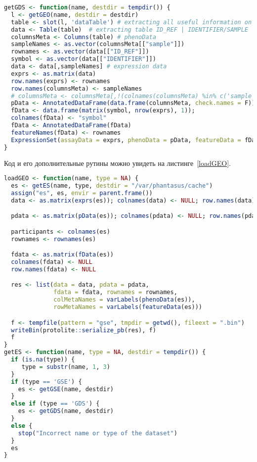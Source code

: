 \documentclass[specification,annotation]{itmo-student-thesis}
\begin{document}
\begin{lstlisting}[float=!h,caption={Загрузка данных типа GDS из Gene Expression Omnibus},label={getGDS},language=R]
 getGDS <- function(name, destdir = tempdir()) {
  l <- getGEO(name, destdir = destdir)
  table <- slot(l, 'dataTable') # extracting all useful information on dataset
  data <- Table(table)  # extracting table ID_REF | IDENTIFIER/SAMPLE | SAMPLE1 | ...
  columnsMeta <- Columns(table) # phenoData
  sampleNames <- as.vector(columnsMeta[["sample"]])
  rownames <- as.vector(data[["ID_REF"]])
  symbol <- as.vector(data[["IDENTIFIER"]])
  data <- data[,sampleNames] # expression data
  exprs <- as.matrix(data)
  row.names(exprs) <- rownames
  row.names(columnsMeta) <- sampleNames
  # columnsMeta <- columnsMeta[,!(colnames(columnsMeta) %in% c('sample'))] 
  pData <- AnnotatedDataFrame(data.frame(columnsMeta, check.names = F))
  fData <- data.frame(matrix(symbol, nrow(exprs), 1));
  colnames(fData) <- "symbol"
  fData <- AnnotatedDataFrame(fData)
  featureNames(fData) <- rownames
  ExpressionSet(assayData = exprs, phenoData = pData, featureData = fData)
}
\end{lstlisting}

Код и его дополнительные рутины можно увидеть на листинге~\ref{loadGEO}.

\begin{lstlisting}[float=!h,caption={Загрузка данных из Gene Expression Omnibus},label={loadGEO},language=R]
loadGEO <- function(name, type = NA) {
  es <- getES(name, type, destdir = "/var/phantasus/cache")
  assign("es", es, envir = parent.frame())
  data <- as.matrix(exprs(es)); colnames(data) <- NULL; row.names(data) <- NULL

  pdata <- as.matrix(pData(es)); colnames(pdata) <- NULL; row.names(pdata) <- NULL

  participants <- colnames(es)
  rownames <- rownames(es)

  fdata <- as.matrix(fData(es))
  colnames(fdata) <- NULL
  row.names(fdata) <- NULL

  res <- list(data = data, pdata = pdata,
              fdata = fdata, rownames = rownames,
              colMetaNames = varLabels(phenoData(es)),
              rowMetaNames = varLabels(featureData(es)))

  f <- tempfile(pattern = "gse", tmpdir = getwd(), fileext = ".bin")
  writeBin(protolite::serialize_pb(res), f)
  f
}
getES <- function(name, type = NA, destdir = tempdir()) {
  if (is.na(type)) {
     type = substr(name, 1, 3)
  }
  if (type == 'GSE') {
    es <- getGSE(name, destdir)
  }
  else if (type == 'GDS') {
    es <- getGDS(name, destdir)
  }
  else {
    stop("Incorrect name or type of the dataset")
  }
  es
}
\end{lstlisting}
\end{document}
